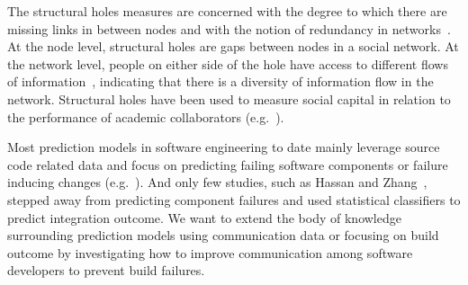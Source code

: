 The structural holes measures are concerned with the degree to which there
are missing links in between nodes and with the notion of redundancy in
networks~\cite{Burt:1995vo}. At the node level, structural holes are gaps between
nodes in a social network. At the network level, people on either side of the
hole have access to different flows of information~\cite{Hargadon:1997asq},
indicating that there is a diversity of information flow in the network.
Structural holes have been used to measure social capital in relation to the
performance of academic collaborators (e.g.~\cite{Brambila:PICMET2007}).

Most prediction models in software engineering to date mainly leverage source
code related data and focus on predicting failing software components or failure
inducing changes
(e.g.~\cite{bell:2005tse,schroeter:isese:2006,zimmermann:icse:2008,kim:2008tse}).
And only few studies, such as Hassan and Zhang~\cite{hassan:ase:2006}, stepped away
from predicting component failures and used statistical classifiers to predict
integration outcome.
We want to extend the body of knowledge surrounding prediction models using communication data or focusing on build outcome by investigating how to improve communication among software developers to prevent build failures.












